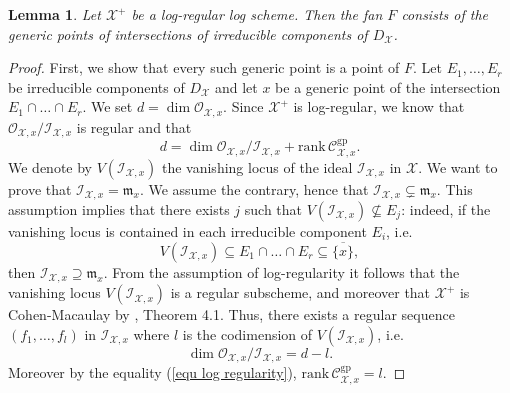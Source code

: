 \documentclass{amsart}%
\numberwithin{equation}{subsection}
\theoremstyle{plain2}
\newtheorem{lemma}[equation]{Lemma}
\theoremstyle{definition2}
\theoremstyle{stepstyle}
\theoremstyle{point}
\theoremstyle{subpoint}
\newcommand{\cX}{\ensuremath{\mathscr{X}}}
\newcommand{\caM}{\ensuremath{\mathcal{M}}}
\newcommand{\caO}{\ensuremath{\mathcal{O}}}
\newcommand{\caI}{\ensuremath{\mathcal{I}}}
\newcommand{\gp}{\mathrm{gp}}
\begin{document}
\begin{lemma} \label{lemma points Kato fan}
Let $\cX^+$ be a log-regular log scheme. Then the fan $F$ consists of the generic points of intersections of irreducible components of $D_{\cX}$.
\end{lemma}
\begin{proof}
First, we show that every such generic point is a point of $F$. Let $E_1,\ldots,E_r$ be irreducible components of $D_{\cX}$ and let $x$ be a generic point of the intersection $E_1\cap\ldots\cap E_r$. We set $d=\dim \mathcal{O}_{\cX,x}$. Since $\cX^+$ is log-regular, we know that $\mathcal{O}_{\cX,x}/\mathcal{I}_{\cX,x}$ is regular and that \begin{equation} \label{equ log regularity}
d=\dim \mathcal{O}_{\cX,x}/\mathcal{I}_{\cX,x}+\mathrm{rank}\,\mathcal{C}^{\gp}_{\cX,x}.\end{equation} We denote by $V(\caI_{\cX,x})$ the vanishing locus of the ideal $\caI_{\cX,x}$ in $\cX$.
We want to prove that $\caI_{\cX,x}= \mathfrak{m}_x$. We assume the contrary, hence that $\caI_{\cX,x} \subsetneq \mathfrak{m}_x$. This assumption implies that there exists $j$ such that $V(\caI_{\cX,x}) \nsubseteq E_j$: indeed, if the vanishing locus is contained in each irreducible component $E_i$, i.e. $$V(\caI_{\cX,x}) \subseteq E_1 \cap \ldots \cap E_r \subseteq \overline{\{x\}},$$ then $\caI_{\cX,x} \supseteq \mathfrak{m}_x$. From the assumption of log-regularity it follows that the vanishing locus $V(\caI_{\cX,x})$ is a regular subscheme, and moreover that $\cX^+$ is Cohen-Macaulay by \cite{Kato1994a}, Theorem 4.1. Thus, there exists a regular sequence $(f_1,\ldots,f_l)$ in $\caI_{\cX,x}$ where $l$ is the codimension of $V(\caI_{\cX,x})$, i.e. $$ \dim \mathcal{O}_{\cX,x}/\mathcal{I}_{\cX,x} = d-l.$$ Moreover by the equality (\ref{equ log regularity}), $\mathrm{rank}\,\mathcal{C}^{\gp}_{\cX,x} = l$.
%
 

\end{proof}
\end{document}
